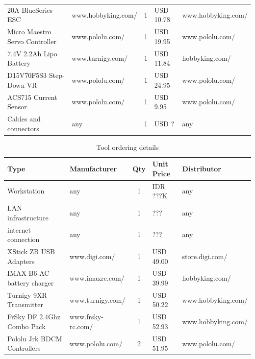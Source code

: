 \documentclass[a4paper, 10pt, twocolumn, titlepage]{article}
\newcommand{\head}[1]{\textnormal{\textbf{#1}}} %
\begin{document}
\begin{table}[!tb]
\begin{tabular}{llcll}
    20A BlueSeries ESC &
    www.hobbyking.com/ &
    1 & 
    USD 10.78 & 
    www.hobbyking.com/ \\
    
    Micro Maestro Servo Controller &
    www.pololu.com/ &
    1 & 
    USD 19.95 & 
    www.pololu.com/ \\
    
    \midrule
    7.4V 2.2Ah Lipo Battery  &
    www.turnigy.com/ &
    1 & 
    USD 11.84 & 
    hobbyking.com/ \\
    
    D15V70F5S3 Step-Down VR &
    www.pololu.com/ &
    1 & 
    USD 24.95 & 
    www.pololu.com/ \\
    
    ACS715 Current Sensor &
    www.pololu.com/ & 
    1 &
    USD 9.95 &
    www.pololu.com/ \\
    
    \midrule
    Cables and connectors  &
    any &
    1 & 
    USD ? & 
    any \\
    
    \bottomrule[1.5pt]
  \end{tabular}
\label{tbl:hw_ordering}
\end{table}

\begin{table}[!tb]
\centering
\caption{Tool ordering details}
  \begin{tabular}{llcll}
    \toprule[1.5pt]
    \head{Type} & \head{Manufacturer} & \head{Qty} & \head{Unit Price} & \head{Distributor} \\
    \midrule
    
    Workstation &
    any &
    1 &
    IDR ???K &
    any \\
    
    LAN infrastructure &
    any &
    1 &
    ??? &
    any \\
    
    internet connection &
    any &
    1 &
    ??? &
    any \\
    
    XStick ZB USB Adapters & 
    www.digi.com/ & 
    1 &
    USD 49.00 & 
    store.digi.com/ \\
        
    IMAX B6-AC battery charger &
    www.imaxrc.com/ &
    1 &
    USD 39.99 &
    hobbyking.com/ \\
    
    Turnigy 9XR Transmitter &
    www.turnigy.com/ &
    1 &
    USD 50.22 &
    www.hobbyking.com/ \\
    
    FrSky DF 2.4Ghz Combo Pack &
    www.frsky-rc.com/ &
    1 &
    USD 52.93 &
    www.hobbyking.com/ \\
    
    Pololu Jrk BDCM Controllers &
    www.pololu.com/ &
    2 &
    USD 51.95 &
    www.pololu.com/ \\
    
    \bottomrule[1.5pt]
  \end{tabular}
\label{tbl:tool_ordering}
\end{table}
\end{document}
